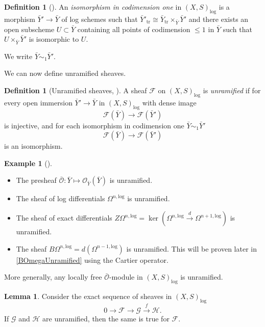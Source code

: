 \documentclass{amsart}
\theoremstyle{definition}
\newtheorem{definition}[theorem]{Definition}
\newtheorem{example}[theorem]{Example}
\newtheorem{lemma}[theorem]{Lemma}
\newcommand\llog{\mathrm{log}}
\numberwithin{equation}{section}
\begin{document}
\begin{definition}[{\cite[Definition 6.1]{LogDiff}}]
	An \textit{isomorphism in codimension one} in $(X,S)_\llog$ is a morphism $\bar{Y}'\to \bar{Y}$ of log schemes such that $\bar{Y}'_{\textrm{tr}}\cong \bar{Y}_{\textrm{tr}}\times_{\bar{Y}}\bar{Y}'$ and there exists an open subscheme $U\subset \bar{Y}$ containing all points of codimension $\leq 1$ in $\bar{Y}$ such that $U\times_{\bar{Y}}\bar{Y}'$ is isomorphic to $U$. 
	
	We write $\bar{Y}\sim_1\bar{Y}'$.
\end{definition}
We can now define unramified sheaves.
\begin{definition}[Unramified sheaves, {\cite[Definition 6.2]{LogDiff}}]
A sheaf $\mathcal{F}$ on $(X,S)_\llog$ is \textit{unramified} if for every open immersion $\bar{Y}'\to \bar{Y}$ in $(X,S)_\llog$ with dense image 
\[
\mathcal{F}(\bar{Y})\to \mathcal{F}(\bar{Y}')
\]
is injective, and for each isomorphism in codimension one  $\bar{Y}\sim_1\bar{Y}'$
\[
\mathcal{F}(\bar{Y})\to \mathcal{F}(\bar{Y}')
\]
is an isomorphism.
\end{definition}
\begin{example}[{\cite[Lemma 6.10]{LogDiff}}]
	\begin{itemize}
			\item The presheaf $\bar{\mathcal{O}}:\bar{Y}\mapsto \mathcal{O}_{\bar{Y}}(\bar{Y})$ is unramified.
			\item The sheaf of log differentials $\Omega^{n,\llog}$ is unramified.
			\item The sheaf of exact differentials $Z\Omega^{n,\llog}= \ker(\Omega^{n,\llog}\xrightarrow{d}\Omega^{n+1,\llog})$ is unramified. 
			
			\item The sheaf $B\Omega^{n,\llog}=d(\Omega^{n-1,\llog})$ is unramified. This will be proven later in \cref{BOmegaUnramified} using the Cartier operator.


	\end{itemize}
	More generally, any locally free $\bar{\mathcal{O}}$-module in $(X,S)_\llog$ is unramified.
\end{example}
\begin{lemma}\label{kernelOfUnramifiedIsUnramified}
	Consider the  exact sequence of sheaves in $(X,S)_\llog$
	\[
	0\to \mathcal{F}\to \mathcal{G} \xrightarrow{f}\mathcal{H}.
	\]
	If $\mathcal{G}$ and $\mathcal{H}$ are unramified, then the same is true for $\mathcal{F}$.
\end{lemma}
\end{document}
